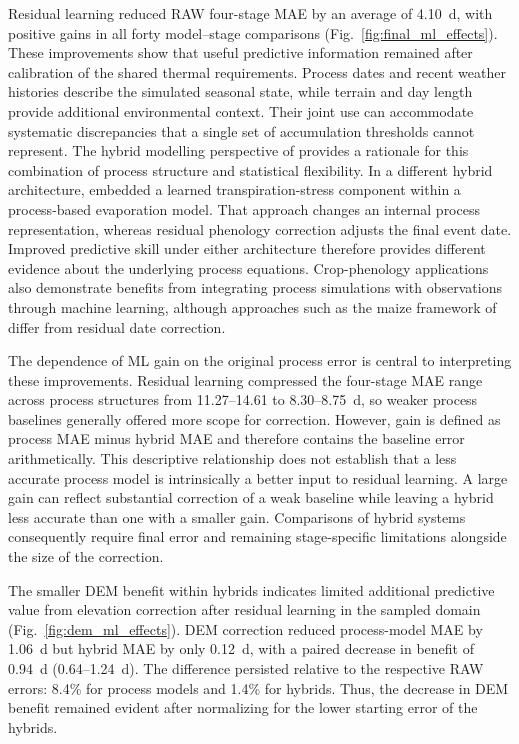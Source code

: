 \documentclass[a4paper,12pt]{article}
\begin{document}
Residual learning reduced RAW four-stage MAE by an average of 4.10~d, with positive gains in all forty model--stage comparisons (Fig.~\ref{fig:final_ml_effects}). These improvements show that useful predictive information remained after calibration of the shared thermal requirements. Process dates and recent weather histories describe the simulated seasonal state, while terrain and day length provide additional environmental context. Their joint use can accommodate systematic discrepancies that a single set of accumulation thresholds cannot represent. The hybrid modelling perspective of \citet{reichsteinDeepLearningProcess2019} provides a rationale for this combination of process structure and statistical flexibility. In a different hybrid architecture, \citet{koppaHybridEvaporation2022} embedded a learned transpiration-stress component within a process-based evaporation model. That approach changes an internal process representation, whereas residual phenology correction adjusts the final event date. Improved predictive skill under either architecture therefore provides different evidence about the underlying process equations. Crop-phenology applications also demonstrate benefits from integrating process simulations with observations through machine learning, although approaches such as the maize framework of \citet{ouContinuousLearningFramework2025} differ from residual date correction.

The dependence of ML gain on the original process error is central to interpreting these improvements. Residual learning compressed the four-stage MAE range across process structures from 11.27--14.61 to 8.30--8.75~d, so weaker process baselines generally offered more scope for correction. However, gain is defined as process MAE minus hybrid MAE and therefore contains the baseline error arithmetically. This descriptive relationship does not establish that a less accurate process model is intrinsically a better input to residual learning. A large gain can reflect substantial correction of a weak baseline while leaving a hybrid less accurate than one with a smaller gain. Comparisons of hybrid systems consequently require final error and remaining stage-specific limitations alongside the size of the correction.

The smaller DEM benefit within hybrids indicates limited additional predictive value from elevation correction after residual learning in the sampled domain (Fig.~\ref{fig:dem_ml_effects}). DEM correction reduced process-model MAE by 1.06~d but hybrid MAE by only 0.12~d, with a paired decrease in benefit of 0.94~d (0.64--1.24~d). The difference persisted relative to the respective RAW errors: 8.4\% for process models and 1.4\% for hybrids. Thus, the decrease in DEM benefit remained evident after normalizing for the lower starting error of the hybrids.
\end{document}

